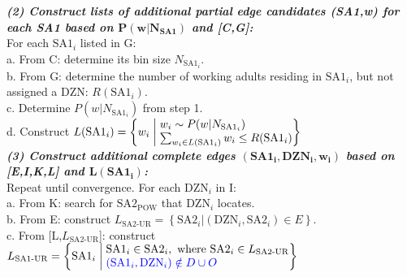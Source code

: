 \documentclass{article}
\begin{document}
\begin{appendices}
\begin{algorithm}[ht]
\begin{algorithmic}
\vspace*{0.25cm}\hspace*{-0.8cm} \textit{\textbf{(2) Construct lists of additional partial edge candidates (SA1,w) for each SA1 based on $\boldsymbol{P(w|N_{SA1})}$ and {[C,G]}:}}\\
\vspace*{0.2cm}\hspace{1cm} For each $\text{SA1}_i$ listed in G:\\
\hspace{1.5cm} a. From C: determine its bin size $N_{\text{SA1}_i}$.\\
\hspace{1.5cm} b. From G: determine the number of working adults residing in $\text{SA1}_i$, but not assigned a DZN: $R(\text{SA1}_i)$.\\
\hspace{1.5cm} c. Determine $P(w|N_{\text{SA1}_i})$ from step 1.\\
\hspace{1.5cm} d. Construct $L(\text{SA1}_i) = \left\{w_i \;\middle\vert\;
   \begin{array}{@{}l@{}}
   w_i \sim P(w|N_{\text{SA1}_i}) \\ 
   \sum_{w_i \in L(\text{SA1}_i)} w_i \leq R(\text{SA1}_i)
   \end{array}
\right\}$\\

\vspace*{0.25cm}\hspace*{0cm} \textit{\textbf{(3) Construct additional complete edges $\boldsymbol{(\text{SA1}_i, \text{DZN}_i, w_i)}$ based on {[E,I,K,L]} and $\boldsymbol{L(\text{SA1}_i)}$:}}\\
\hspace*{1cm} Repeat until convergence. For each $\text{DZN}_i$ in I:\\
\hspace*{1.5cm} a. From K: search for $\text{SA2}_{\text{POW}}$ that $\text{DZN}_i$ locates.\\
\hspace*{1.5cm} b. From E: construct $L_{\text{SA2-UR}} = \left\{\text{SA2}_i | (\text{DZN}_i, \text{SA2}_i) \in E \right\}$.\\
\hspace*{1.5cm} c. From [L,$L_{\text{SA2-UR}}$]: construct $L_{\text{SA1-UR}} = \left\{\text{SA1}_i \;\middle\vert\;
   \begin{array}{@{}l@{}}
   \text{SA1}_i \in \text{SA2}_i, \text{ where SA2}_i \in L_{\text{SA2-UR}}\\ 
   \textcolor{blue}{(\text{SA1}_i,\text{DZN}_i) \notin D \cup O} %
   \end{array}
\right\}$\\


\end{algorithmic}
\end{algorithm}
\end{appendices}
\end{document}
